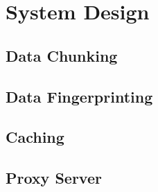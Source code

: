 \section{System Design}
\label{sec:sys_design}
\subsection{Data Chunking}
\subsection{Data Fingerprinting}
\subsection{Caching}
\subsection{Proxy Server}

